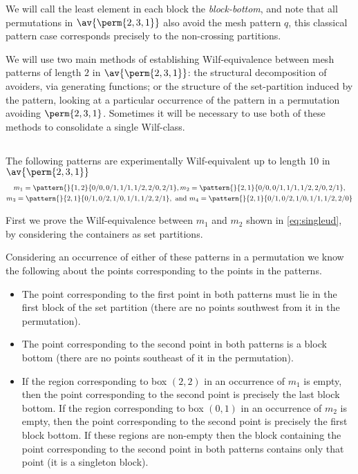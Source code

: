 We will call the least element in each block the \emph{block-bottom}, and note that all permutations
in \(\av{\perm{2,3,1}}\) also avoid the mesh pattern \(q\), this classical pattern case
corresponds precisely to the non-crossing partitions.

We will use two main methods of establishing Wilf-equivalence between mesh patterns of length \(2\)
in \(\av{\perm{2,3,1}}\): the structural decomposition of avoiders, via generating functions; or the
structure of the set-partition induced by the pattern, looking at a particular occurrence of the
pattern in a permutation avoiding \(\perm{2,3,1}\). Sometimes it will be necessary to use both of
these methods to consolidate a single Wilf-class.

\subsection{}
\nextvar
The following patterns are experimentally Wilf-equivalent up to length 10 in
\(\av{\perm{2,3,1}}\)
\begin{gather}
    m_1 = \pattern{}{1,2}{0/0,0/1,1/1,1/2,2/0,2/1},
    m_2 = \pattern{}{2,1}{0/0,0/1,1/1,1/2,2/0,2/1}, \label{eq:singleud}\\
    m_3 = \pattern{}{2,1}{0/1,0/2,1/0,1/1,1/2,2/1}, \text{ and }
    m_4 = \pattern{}{2,1}{0/1,0/2,1/0,1/1,1/2,2/0} \label{eq:other}
\end{gather}

First we prove the Wilf-equivalence between \(m_1\) and \(m_2\) shown in
\eqref{eq:singleud}, by considering the containers as set partitions.

Considering an occurrence of either of these patterns in a permutation  we know
the following about the points corresponding to the points in the patterns.
\begin{itemize}
    \item The point corresponding to the first point in both patterns
        must lie in the first block of the set partition (there are
        no points southwest from it in the permutation).
    \item The point corresponding to the second point in both patterns
        is a block bottom (there are no points southeast of it in
        the permutation).
    \item If the region corresponding to box \((2,2)\) in an occurrence of
    \(m_1\) is empty, then the point corresponding to the second point is
    precisely the last block bottom. If the region corresponding to box \((0,1)\)
    in an occurrence of \(m_2\) is empty, then the point corresponding to the
    second point is precisely the first block bottom.
    If these regions are non-empty then the block containing the point
    corresponding to the second point in both patterns contains only that point
    (it is a singleton block).
\end{itemize}

